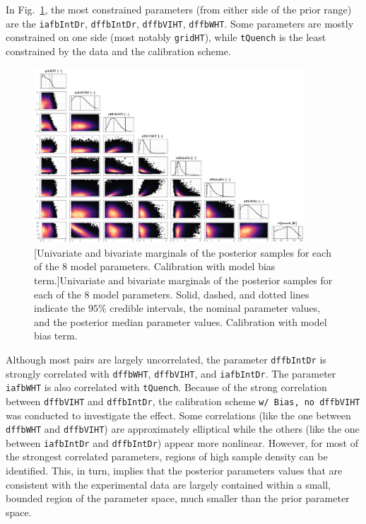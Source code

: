 In Fig.~\ref{fig:ch5_plot_ens_all_disc_centered}, the most constrained parameters (from either side of the prior range) are the \texttt{iafbIntDr}, \texttt{dffbIntDr}, \texttt{dffbVIHT}, \texttt{dffbWHT}.
Some parameters are mostly constrained on one side (most notably \texttt{gridHT}), while \texttt{tQuench} is the least constrained by the data and the calibration scheme.

\begin{figure}
	\centering
	\includegraphics[width=0.90\textwidth]{../figures/chapter5/figures/plotEnsAllDiscCentered}
		[Univariate and bivariate marginals of the posterior samples for each of the $8$ model parameters. Calibration with model bias term.]{Univariate and bivariate marginals of the posterior samples for each of the $8$ model parameters. Solid, dashed, and dotted lines indicate the $95\%$ credible intervals, the nominal parameter values, and the posterior median parameter values. Calibration with model bias term.}
	\label{fig:ch5_plot_ens_all_disc_centered}
\end{figure}

Although most pairs are largely uncorrelated, the parameter \texttt{dffbIntDr} is strongly correlated with \texttt{dffbWHT}, \texttt{dffbVIHT}, and \texttt{iafbIntDr}.
The parameter \texttt{iafbWHT} is also correlated with \texttt{tQuench}.
Because of the strong correlation between \texttt{dffbVIHT} and \texttt{dffbIntDr}, the calibration scheme \texttt{w/ Bias, no dffbVIHT} was conducted to investigate the effect.
Some correlations (like the one between \texttt{dffbWHT} and \texttt{dffbVIHT}) are approximately elliptical while the others (like the one between \texttt{iafbIntDr} and \texttt{dffbIntDr}) appear more nonlinear.
However, for most of the strongest correlated parameters, regions of high sample density can be identified.
This, in turn, implies that the posterior parameters values that are consistent with the experimental data are largely contained within a small, bounded region of the parameter space, much smaller than the prior parameter space.

